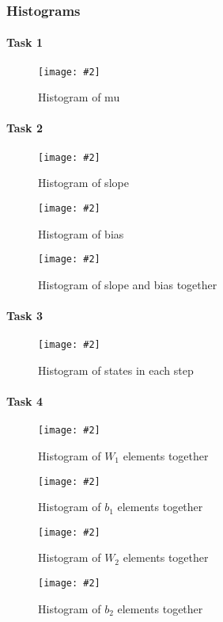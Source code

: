 \documentclass{article}
\newcommand{\centerfigcap}[3]{\begin{figure}[H]
\begin{center}\texttt{[image: \#2]} \caption{#3}\end{center}
\end{figure}}
\begin{document}
\subsubsection{Histograms}
\paragraph{Task 1}
\centerfigcap{0.6}{../Results/graph_1}{Histogram of mu}
\paragraph{Task 2}
\centerfigcap{0.6}{../Results/graph_2_slope}{Histogram of slope}
\centerfigcap{0.6}{../Results/graph_2_bias}{Histogram of bias}
\centerfigcap{0.7}{../Results/graph_2_both}{Histogram of slope and bias together}
\paragraph{Task 3}
\centerfigcap{1}{../Results/graph_3}{Histogram of states in each step}
\paragraph{Task 4}
\centerfigcap{0.7}{../Results/graph_4_w1}{Histogram of $W_1$ elements together}
\centerfigcap{0.7}{../Results/graph_4_b1}{Histogram of $b_1$ elements together}
\centerfigcap{1}{../Results/graph_4_w2}{Histogram of $W_2$ elements together}
\centerfigcap{0.7}{../Results/graph_4_b2}{Histogram of $b_2$ elements together}
\end{document}
